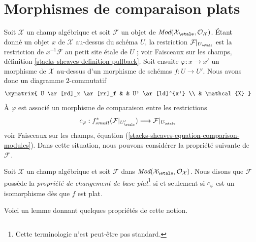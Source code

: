 \section{Morphismes de comparaison plats}
\label{section-flat-comparison}

\noindent
Soit $\mathcal{X}$ un champ algébrique et soit $\mathcal{F}$ un objet
de $\textit{Mod}(\mathcal{X}_\etale, \mathcal{O}_\mathcal{X})$.
Étant donné un objet $x$ de $\mathcal{X}$ au-dessus du schéma $U$, la
restriction $\mathcal{F}|_{U_\etale}$ est la restriction de
$x^{-1}\mathcal{F}$ au petit site étale de $U$ ; voir
Faisceaux sur les champs, définition \ref{stacks-sheaves-definition-pullback}.
Soit ensuite $\varphi : x \to x'$ un morphisme de $\mathcal{X}$ au-dessus
d'un morphisme de schémas $f : U \to U'$. Nous avons donc un diagramme $2$-commutatif
$$
\xymatrix{
U \ar[rd]_x \ar[rr]_f & & U' \ar[ld]^{x'} \\
& \mathcal{X}
}
$$
À $\varphi$ est associé un morphisme de comparaison entre les restrictions
\begin{equation}
\label{equation-comparison-modules}
c_\varphi :
f_{small}^*(\mathcal{F}|_{U'_\etale})
\longrightarrow
\mathcal{F}|_{U_\etale}
\end{equation}
voir Faisceaux sur les champs, équation
(\ref{stacks-sheaves-equation-comparison-modules}).
Dans cette situation, nous pouvons considérer la propriété suivante
de $\mathcal{F}$.

\begin{definition}
\label{definition-flat-base-change}
Soit $\mathcal{X}$ un champ algébrique et soit $\mathcal{F}$ dans
$\textit{Mod}(\mathcal{X}_\etale, \mathcal{O}_\mathcal{X})$.
Nous disons que $\mathcal{F}$ possède la {\it propriété de changement de base plat}\footnote{Cette
terminologie n'est peut-être pas standard.}
si et seulement si $c_\varphi$ est un isomorphisme dès que $f$ est plat.
\end{definition}

\noindent
Voici un lemme donnant quelques propriétés de cette notion.

